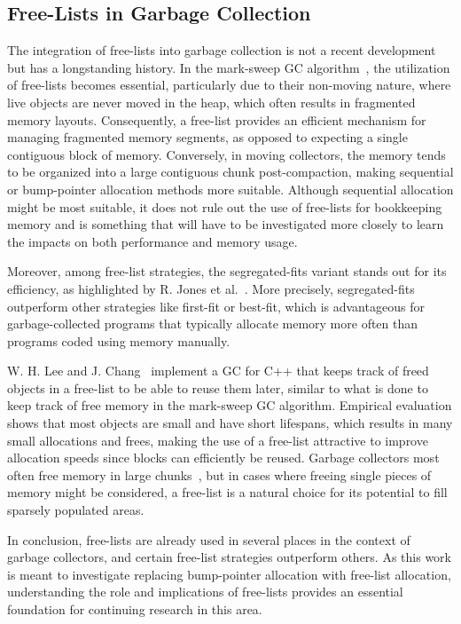 \subsection{Free-Lists in Garbage Collection}

The integration of free-lists into garbage collection is not a recent development but has a longstanding history. In the mark-sweep GC algorithm~\cite{mark_sweep}, the utilization of free-lists becomes essential, particularly due to their non-moving nature, where live objects are never moved in the heap, which often results in fragmented memory layouts. Consequently, a free-list provides an efficient mechanism for managing fragmented memory segments, as opposed to expecting a single contiguous block of memory. Conversely, in moving collectors, the memory tends to be organized into a large contiguous chunk post-compaction, making sequential or bump-pointer allocation methods more suitable. Although sequential allocation might be most suitable, it does not rule out the use of free-lists for bookkeeping memory and is something that will have to be investigated more closely to learn the impacts on both performance and memory usage.

Moreover, among free-list strategies, the segregated-fits variant stands out for its efficiency, as highlighted by R. Jones et al.~\cite[Section 7.8]{gchandbook}. More precisely, segregated-fits outperform other strategies like first-fit or best-fit, which is advantageous for garbage-collected programs that typically allocate memory more often than programs coded using memory manually.

W. H. Lee and J. Chang~\cite{samsung_gc_free_list} implement a GC for C++ that keeps track of freed objects in a free-list to be able to reuse them later, similar to what is done to keep track of free memory in the mark-sweep GC algorithm. Empirical evaluation shows that most objects are small and have short lifespans, which results in many small allocations and frees, making the use of a free-list attractive to improve allocation speeds since blocks can efficiently be reused. Garbage collectors most often free memory in large chunks~\cite[Section 7.8]{gchandbook}, but in cases where freeing single pieces of memory might be considered, a free-list is a natural choice for its potential to fill sparsely populated areas.

In conclusion, free-lists are already used in several places in the context of garbage collectors, and certain free-list strategies outperform others. As this work is meant to investigate replacing bump-pointer allocation with free-list allocation, understanding the role and implications of free-lists provides an essential foundation for continuing research in this area.


